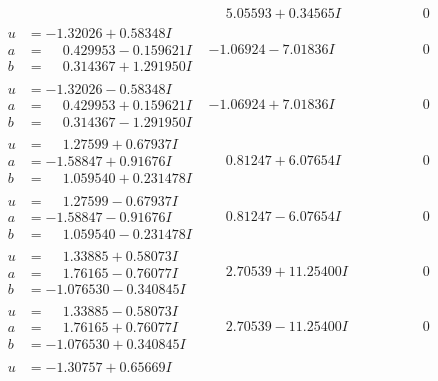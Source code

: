 \documentclass[1p]{elsarticle_modified}
\theoremstyle{definition}
\begin{document}
$$\begin{array}{c|c|c}
 & \phantom{-}5.05593 + 0.34565 I & \phantom{-0.000000 } 0 \\ \hline\begin{aligned}
u &= -1.32026 + 0.58348 I \\
a &= \phantom{-}0.429953 - 0.159621 I \\
b &= \phantom{-}0.314367 + 1.291950 I\end{aligned}
 & -1.06924 - 7.01836 I & \phantom{-0.000000 } 0 \\ \hline\begin{aligned}
u &= -1.32026 - 0.58348 I \\
a &= \phantom{-}0.429953 + 0.159621 I \\
b &= \phantom{-}0.314367 - 1.291950 I\end{aligned}
 & -1.06924 + 7.01836 I & \phantom{-0.000000 } 0 \\ \hline\begin{aligned}
u &= \phantom{-}1.27599 + 0.67937 I \\
a &= -1.58847 + 0.91676 I \\
b &= \phantom{-}1.059540 + 0.231478 I\end{aligned}
 & \phantom{-}0.81247 + 6.07654 I & \phantom{-0.000000 } 0 \\ \hline\begin{aligned}
u &= \phantom{-}1.27599 - 0.67937 I \\
a &= -1.58847 - 0.91676 I \\
b &= \phantom{-}1.059540 - 0.231478 I\end{aligned}
 & \phantom{-}0.81247 - 6.07654 I & \phantom{-0.000000 } 0 \\ \hline\begin{aligned}
u &= \phantom{-}1.33885 + 0.58073 I \\
a &= \phantom{-}1.76165 - 0.76077 I \\
b &= -1.076530 - 0.340845 I\end{aligned}
 & \phantom{-}2.70539 + 11.25400 I & \phantom{-0.000000 } 0 \\ \hline\begin{aligned}
u &= \phantom{-}1.33885 - 0.58073 I \\
a &= \phantom{-}1.76165 + 0.76077 I \\
b &= -1.076530 + 0.340845 I\end{aligned}
 & \phantom{-}2.70539 - 11.25400 I & \phantom{-0.000000 } 0 \\ \hline\begin{aligned}
u &= -1.30757 + 0.65669 I \\

\end{aligned}
\end{array}$$
\end{document}
